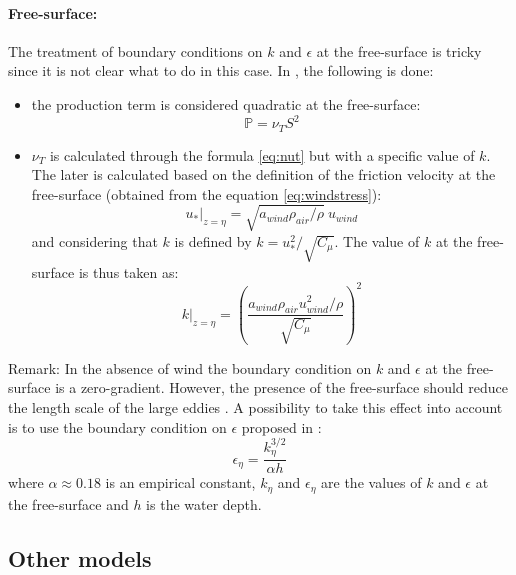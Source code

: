 \paragraph{Free-surface:}
The treatment of boundary conditions on $k$ and $\epsilon$ at the free-surface
is tricky since it is not clear what to do in this case.
In , the following is done:
\begin{itemize}
\item the production term is considered quadratic at the free-surface:
\begin{equation}
\mathbb{P}=\nu_TS^2
\end{equation}
\item $\nu_T$ is calculated through the formula \eqref{eq:nut} but with a specific value of $k$.
The later is calculated based on the definition of the friction
velocity at the free-surface (obtained from the equation \eqref{eq:windstress}):
\begin{equation}
u_\ast|_{z=\eta}=\sqrt{a_{wind}\rho_{air}/\rho}~u_{wind}
\end{equation}
and considering that $k$ is defined by $k=u_\ast^2/\sqrt{C_\mu}$. The value
of $k$ at the free-surface is thus taken as:
\begin{equation}
k|_{z=\eta}=\left(\dfrac{a_{wind}\rho_{air}u_{wind}^2/\rho}{\sqrt{C_\mu}}\right)^2
\end{equation}
\end{itemize}

\begin{CommentBlock}{Remark:}
In the absence of wind the boundary condition on $k$ and $\epsilon$
at the free-surface is a zero-gradient.
However, the presence of the free-surface should reduce the length scale of the large eddies \cite{Hunt1984}.
A possibility to take this effect into account is to use the boundary condition on $\epsilon$
proposed in \cite{Celik1984}:
\begin{equation}
\epsilon_\eta=\dfrac{k_\eta^{3/2}}{\alpha h}
\end{equation}
where $\alpha \approx 0.18$ is an empirical constant, $k_\eta$ and $\epsilon_\eta$ are
the values of $k$ and $\epsilon$ at the free-surface and $h$ is the water depth.
\end{CommentBlock}

\subsection{Other models}


